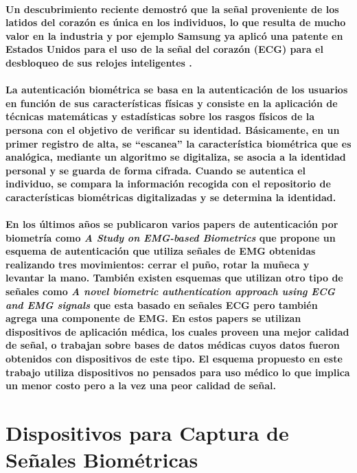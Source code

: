 \documentclass{article}
\begin{document}
\paragraph{
Un descubrimiento reciente demostró que la señal proveniente de los latidos del corazón es única en los individuos, lo que resulta de mucho valor en la industria y por ejemplo Samsung ya aplicó una patente en Estados Unidos para el uso de la señal del corazón (ECG) para el desbloqueo de sus relojes inteligentes \cite{samsung2016}.
}
\paragraph{
La autenticación biométrica se basa en la autenticación de los usuarios en función de sus características físicas y consiste en la aplicación de técnicas matemáticas y estadísticas sobre los rasgos físicos de la persona con el objetivo de verificar su identidad. Básicamente, en un primer registro de alta, se “escanea” la característica biométrica que es analógica, mediante un algoritmo se digitaliza, se asocia a la identidad personal y se guarda de forma cifrada. Cuando se autentica el individuo, se compara la información recogida con el repositorio de características biométricas digitalizadas y se determina la identidad. \cite{esparza2017}
}
\paragraph{
En los últimos años se publicaron varios papers de autenticación por biometría como \emph{A Study on EMG-based Biometrics} \cite{jinsu2017} que propone un esquema de autenticación que utiliza señales de EMG obtenidas realizando tres movimientos: cerrar el puño, rotar la muñeca y levantar la mano. También existen esquemas que utilizan otro tipo de señales como \emph{A novel biometric authentication approach using ECG and EMG signals} \cite{nbfnf2015} que esta basado en señales ECG pero también agrega una componente de EMG. En estos papers se utilizan dispositivos de aplicación médica, los cuales proveen una mejor calidad de señal, o trabajan sobre bases de datos médicas cuyos datos fueron obtenidos con dispositivos de este tipo. El esquema propuesto en este trabajo utiliza dispositivos no pensados para uso médico lo que implica un menor costo pero a la vez una peor calidad de señal.
}

\section{Dispositivos para Captura de Señales Biométricas}
\end{document}
